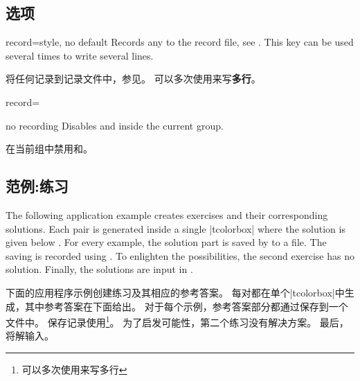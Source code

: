 \subsection{选项}\label{sec:recording-options}
\begin{docTcbKey}[][doc new=2014-11-28]{record}{=}{style, no default}
Records any  to the record file, see .
This key can be used several times to write several lines.

将任何记录到记录文件中，参见。%
可以多次使用来写{\bf 多行}。
  
\begin{dispListing}
record={\string{}}
\end{dispListing}
\end{docTcbKey}

\begin{docTcbKey}[][doc new=2014-11-28]{no recording}{}{}
Disables  and  inside the current   group.

在当前组中禁用和。
\end{docTcbKey}

\subsection{范例:练习}\label{sec:recording-exercises}
The following application example creates exercises and their corresponding solutions. 
Each pair is generated inside a single |tcolorbox| where the solution is given below . 
For every example, the solution part is saved by  to a file. 
The saving is recorded using . 
To enlighten the possibilities, the second exercise has no solution. 
Finally, the solutions are input in .

下面的应用程序示例创建练习及其相应的参考答案。%
每对都在单个|tcolorbox|中生成，其中参考答案在下面给出。%
对于每个示例，参考答案部分都通过保存到一个文件中。%
保存记录使用\footnote{可以多次使用来写多行}。%
为了启发可能性，第二个练习没有解决方案。%
最后，将解输入。

